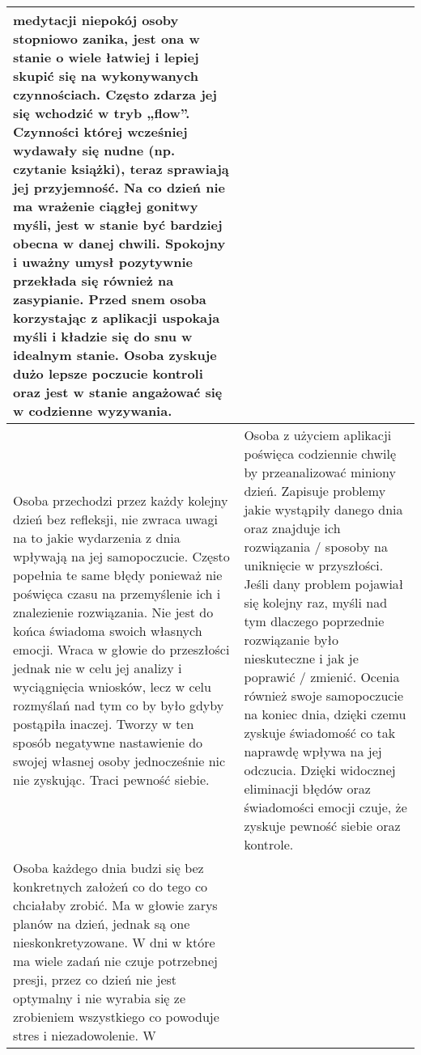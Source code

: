 \documentclass[12pt, letterpaper]{article}
\begin{document}
\begin{center}
\begin{longtable}{ | m{} | m{} | }
            medytacji niepokój osoby stopniowo zanika, jest ona w stanie o wiele
            łatwiej i lepiej skupić się na wykonywanych czynnościach. Często
            zdarza jej się wchodzić w tryb „flow”. Czynności której wcześniej
            wydawały się nudne (np. czytanie książki), teraz sprawiają jej
            przyjemność. Na co dzień nie ma wrażenie ciągłej gonitwy myśli, jest
            w stanie być bardziej obecna w danej chwili. Spokojny i uważny umysł
            pozytywnie przekłada się również na zasypianie. Przed snem osoba
            korzystając z aplikacji uspokaja myśli i kładzie się do snu w
            idealnym stanie. Osoba zyskuje dużo lepsze poczucie kontroli oraz
            jest w stanie angażować się w codzienne wyzywania. \\
            \hline
            Osoba przechodzi przez każdy kolejny dzień bez refleksji, nie zwraca
            uwagi na to jakie wydarzenia z dnia wpływają na jej samopoczucie.
            Często popełnia te same błędy ponieważ nie poświęca czasu na
            przemyślenie ich i znalezienie rozwiązania. Nie jest do końca
            świadoma swoich własnych emocji. Wraca w głowie do przeszłości
            jednak nie w celu jej analizy i wyciągnięcia wniosków, lecz w celu
            rozmyślań nad tym co by było gdyby postąpiła inaczej. Tworzy w ten
            sposób negatywne nastawienie do swojej własnej osoby jednocześnie
            nic nie zyskując. Traci pewność siebie. & Osoba z użyciem aplikacji
            poświęca codziennie chwilę by przeanalizować miniony dzień. Zapisuje
            problemy jakie wystąpiły danego dnia oraz znajduje ich rozwiązania /
            sposoby na uniknięcie w przyszłości. Jeśli dany problem pojawiał się
            kolejny raz, myśli nad tym dlaczego poprzednie rozwiązanie było
            nieskuteczne i jak je poprawić / zmienić. Ocenia również swoje
            samopoczucie na koniec dnia, dzięki czemu zyskuje świadomość co tak
            naprawdę wpływa na jej odczucia. Dzięki widocznej eliminacji błędów
            oraz świadomości emocji czuje, że zyskuje pewność siebie oraz
            kontrole. \\
            \hline
            Osoba każdego dnia budzi się bez konkretnych założeń co do tego co
            chciałaby zrobić. Ma w głowie zarys planów na dzień, jednak  są one
            nieskonkretyzowane. W dni w które ma wiele zadań nie czuje
            potrzebnej presji, przez co dzień nie jest optymalny i nie wyrabia
            się ze zrobieniem wszystkiego co powoduje stres i niezadowolenie. W

\end{longtable}
\end{center}
\end{document}
